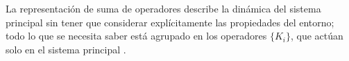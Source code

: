 La representación de suma de operadores describe la dinámica del sistema principal sin tener que considerar explícitamente las propiedades del entorno; todo lo que se necesita saber está agrupado en los operadores $\{K_i\}$, que actúan solo en el sistema principal {\cite{nielsen_chuang_2010}}.



\begin{comment}
\subsubsection{Mediciones y representación de Kraus}\label{subsubsec:Medicion_RepresentacionDeKraus} %

Considere un sistema primario $\mathcal{H}_Q$, inicialmente en el estado
$\rho$,  el cual está en contacto con un sistema auxiliar $\mathcal{H}_A$
(este también es llamado <<ancilla>> y puede ser pensado como el ambiente o un
aparato de medición), inicialmente en el estado $\sigma=\sum_k \lambda_k
|e_k\rala e_k|$, donde esta representación es la descomposición espectral de
$\sigma$. El sistema auxiliar está sujeto a las mediciones de von Neumann,
descritas por los operadores de proyección $P_\alpha=\sum_j |f_{\alpha j}\rala
f_{\alpha j}|$,  donde $|f_{\alpha j}\ra$ forman una base ortonormal de
$\mathcal{H}_A$ y satisfacen la relación de completitud. Si el resultado de la
medición es $\alpha$, el sistema auxiliar es observado estando en el subespacio
$S_\alpha$. Los dos sistemas interactúan durante un tiempo, esta interacción es
descrita por un operador unitario $U$ que actúa sobre el sistema conjunto
$\mathcal{H}_Q\otimes \mathcal{H}_A$. El estado no normalizado del sistema
después de la medición se obtiene proyectando el estado conjunto, en el
subespacio $S_\alpha$ y luego aplicando la traza parcial sobre $\mathcal{H}_A$,

\begin{equation}\label{measurement_model}
    \tr_A(P_\alpha U \rho \otimes \sigma U^\dagger P_\alpha)= \tr_A(P_\alpha U \rho \otimes \sigma U^\dagger)\equiv \E_\alpha(\rho),
\end{equation} 
donde $\E_\alpha$ es un mapeo lineal en el sistema de los operadores de
densidad. Este método de definir un conjunto de operaciones cuánticas en
términos de interacción con un ancilla inicialmente no correlacionado, seguido
de la medición en el ancilla, se denomina modelo de medición {\cite{unm2014,
nielsen_chuang_2010}}.


\end{comment}
